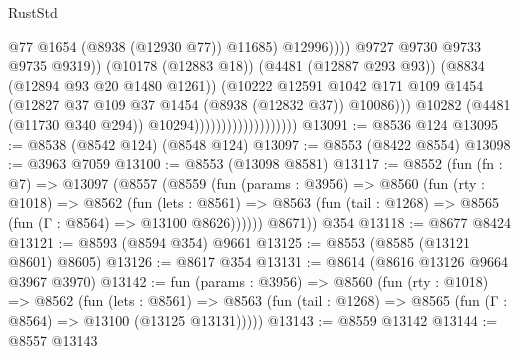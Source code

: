 \begin{lexlean}{RustStd}
\begin{coremodule}
                                                          @77
                                                          @1654
                                                          (@8938 (@12930 @77))
                                                          @11685)
                                                        @12996))))
                                                @9727
                                                @9730
                                                @9733
                                                @9735
                                                @9319))
                                            (@10178 (@12883 @18))
                                            (@4481 (@12887 @293 @93))
                                            (@8834 (@12894 @93 @20 @1480 @1261))
                                            (@10222
                                              @12591
                                              @1042
                                              @171
                                              @109
                                              @1454
                                              (@12827
                                                @37
                                                @109
                                                @37
                                                @1454
                                                (@8938 (@12832 @37))
                                                @10086)))
                                          @10282
                                          (@4481 (@11730 @340 @294))
                                          @10294)))))))))))))))))))
@13091 := @8536 @124
@13095 := @8538 (@8542 @124) (@8548 @124)
@13097 := @8553 (@8422 @8554)
@13098 := @3963 @7059
@13100 := @8553 (@13098 @8581)
@13117 := @8552
    (fun (fn : @7) =>
    @13097
      (@8557
        (@8559
          (fun (params : @3956) =>
          @8560
            (fun (rty : @1018) =>
            @8562
              (fun (lets : @8561) =>
              @8563 (fun (tail : @1268) => @8565 (fun (Γ : @8564) => @13100 @8626))))))
        @8671))
    @354
@13118 := @8677 @8424
@13121 := @8593 (@8594 @354) @9661
@13125 := @8553 (@8585 (@13121 @8601) @8605)
@13126 := @8617 @354
@13131 := @8614 (@8616 @13126 @9664 @3967 @3970)
@13142 := fun (params : @3956) =>
  @8560
    (fun (rty : @1018) =>
    @8562
      (fun (lets : @8561) =>
      @8563 (fun (tail : @1268) => @8565 (fun (Γ : @8564) => @13100 (@13125 @13131)))))
@13143 := @8559 @13142
@13144 := @8557 @13143

\end{coremodule}
\end{lexlean}
